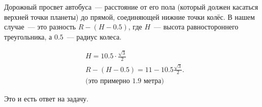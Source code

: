 \begin{itemize}
Дорожный просвет автобуса~— расстояние от его пола (который должен касаться верхней точки планеты) до прямой, соединяющей нижние точки колёс. В нашем случае~— это разность $R-(H-0.5)$, где $H$~— высота равностороннего треугольника, а $0.5$~— радиус колеса.

\begin{align*}
	& H = 10.5 \cdot \frac{\sqrt{3}}{2} \\
	& R-(H-0.5) = 11 - 10.5\frac{\sqrt{3}}{2}. \\
	& \text{(это примерно 1.9 метра)}
\end{align*}

Это и есть ответ на задачу.
\end{itemize}
